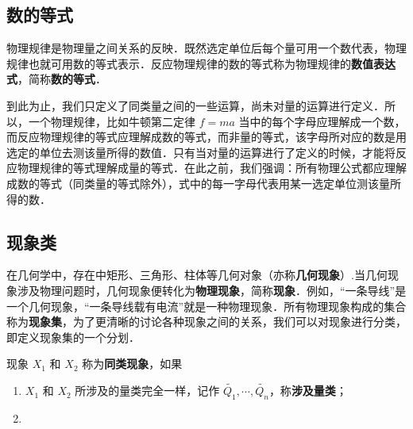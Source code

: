 
\subsection{数的等式}
物理规律是物理量之间关系的反映．既然选定单位后每个量可用一个数代表，物理规律也就可用数的等式表示．反应物理规律的数的等式称为物理规律的\textbf{数值表达式}，简称\textbf{数的等式}．

到此为止，我们只定义了同类量之间的一些运算，尚未对量的运算进行定义．所以，一个物理规律，比如牛顿第二定律 $f=ma$ 当中的每个字母应理解成一个数，而反应物理规律的等式应理解成数的等式，而非量的等式，该字母所对应的数是用选定的单位去测该量所得的数值．只有当对量的运算进行了定义的时候，才能将反应物理规律的等式理解成量的等式．在此之前，我们强调：所有物理公式都应理解成数的等式（同类量的等式除外），式中的每一字母代表用某一选定单位测该量所得的数．
\subsection{现象类}
在几何学中，存在中矩形、三角形、柱体等几何对象（亦称\textbf{几何现象}）.当几何现象涉及物理问题时，几何现象便转化为\textbf{物理现象}，简称\textbf{现象}．例如，“一条导线”是一个几何现象，“一条导线载有电流”就是一种物理现象．所有物理现象构成的集合称为\textbf{现象集}，为了更清晰的讨论各种现象之间的关系，我们可以对现象进行分类，即定义现象集的一个分划．

\begin{definition}{}
现象 $X_1$ 和 $X_2$ 称为\textbf{同类现象}，如果
\begin{enumerate}
\item $X_1$ 和 $X_2$ 所涉及的量类完全一样，记作 $\tilde{Q_1},\cdots,\tilde{Q_n}$，称\textbf{涉及量类}； 
\item
\end{enumerate}

\end{definition}